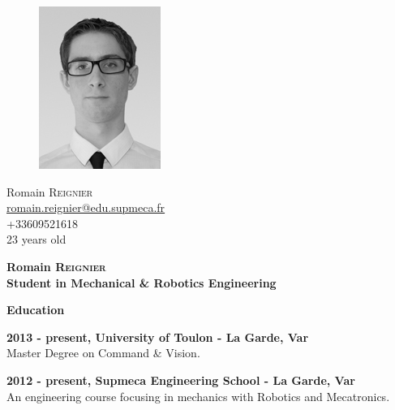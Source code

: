 \documentclass[a4paper,12pt,final]{memoir}
\newcommand{\Sep}{\vspace{1.5em}}
\newcommand{\SmallSep}{\vspace{0.5em}}
\newenvironment{AboutMe}
	{\ignorespaces\textbf{\color{RoyalBlue} About me}}
	{\Sep\ignorespacesafterend}
\newcommand{\CVSection}[1]
	{\Large\textbf{#1}\par
	\SmallSep\normalsize\normalfont}
\newcommand{\CVItem}[2]
	{\textbf{\color{RoyalBlue} #1 - {\small\color{black}#2}}\normalsize\normalfont}
\begin{document}
\begin{figure}
	\hfill
	\includegraphics[width=0.6\columnwidth]{IMG_7936-Modifier_cv}
	\vspace{-7cm}
\end{figure}

\begin{flushright}\small
	Romain \textsc{Reignier} \\
	\url{romain.reignier@edu.supmeca.fr}  \\
	+33609521618 \\
	23 years old
\end{flushright}\normalsize
\framebreak


\Huge\bfseries {\color{RoyalBlue} Romain \textsc{Reignier}} \\
\Large\bfseries  Student in Mechanical \& Robotics Engineering \\

\normalsize\normalfont


\CVSection{Education}

\CVItem{2013 - present, University of Toulon}{La Garde, Var}\\
Master Degree on Command \& Vision.
\SmallSep

\CVItem{2012 - present, Supmeca Engineering School}{La Garde, Var}\\
An engineering course focusing in mechanics with Robotics and Mecatronics.
\SmallSep
\end{document}
